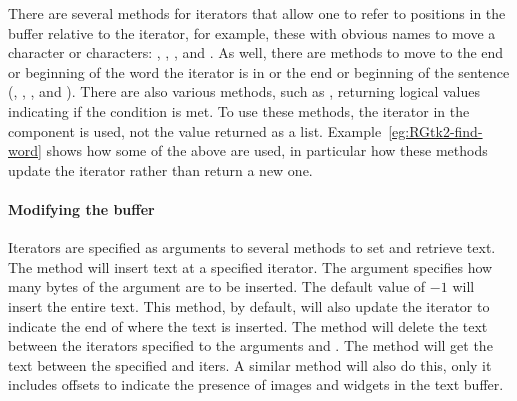There are several methods for iterators that allow one to refer to
positions in the buffer relative to the iterator, for example, these
with obvious names to move a character or characters:
, ,
, and
. As well, there are methods to
move to the end or beginning of the word the iterator is in or the end
or beginning of the sentence (,
,
, and
).  There are also various methods,
such as , returning logical values
indicating if the condition is met.
To use these methods, the iterator in the
 component is used, not the value returned as a
list. Example~\ref{eg:RGtk2-find-word} shows how some of the above are
used, in particular how these methods update the iterator rather than
return a new one.

\paragraph{Modifying the buffer}
Iterators are specified as arguments to several methods to set and
retrieve text. The  method will insert
text at a specified iterator. The argument
 specifies how many bytes of the
 argument are to be inserted. The default value of $-1$
will insert the entire text. This
method, by default, will also update the iterator to indicate the end
of where the text is inserted. The 
method will delete the text between the iterators specified to the
arguments  and
. The
 method will get the text between the
specified  and
 iters. A similar method
 will also do this, only it includes
offsets to indicate the presence of images and widgets in the text
buffer.

